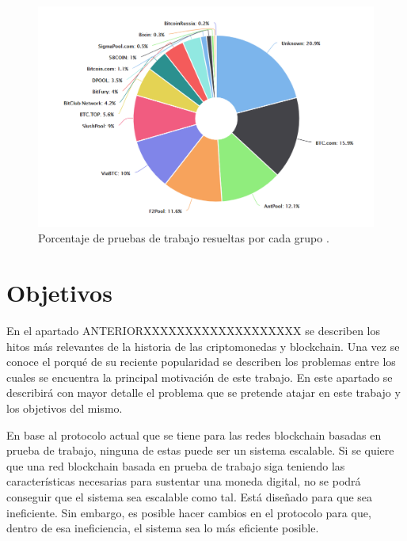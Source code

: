 \begin{figure}
	\centering
	\includegraphics[width=1\textwidth]{imagenes/minninpools.PNG}
	\caption{\label{fig1}Porcentaje de pruebas de trabajo resueltas por cada grupo \cite{blockchaininfo}.}
\end{figure}





\section{Objetivos}

En el apartado ANTERIORXXXXXXXXXXXXXXXXXXX se describen los hitos más relevantes de la historia de las criptomonedas y blockchain. Una vez se conoce el porqué de su reciente popularidad se describen los problemas entre los cuales se encuentra la principal motivación de este trabajo. En este apartado se describirá con mayor detalle el problema que se pretende atajar en este trabajo y los objetivos del mismo. \newline

En base al protocolo actual que se tiene para las redes blockchain basadas en prueba de trabajo, ninguna de estas puede ser un sistema escalable. Si se quiere que una red blockchain basada en prueba de trabajo siga teniendo las características necesarias para sustentar una moneda digital, no se podrá conseguir que el sistema sea escalable como tal. Está diseñado para que sea ineficiente. Sin embargo, es posible hacer cambios en el protocolo para que, dentro de esa ineficiencia, el sistema sea lo más eficiente posible. \newline

